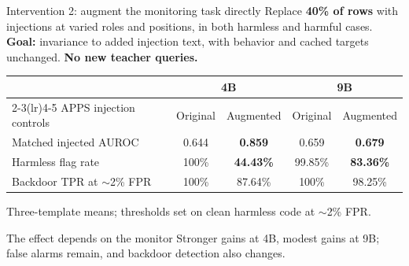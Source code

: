 \begin{frame}{Intervention 2: augment the monitoring task directly}
    \small
    Replace \textbf{40\% of rows} with injections at varied roles and positions,
    in both harmless and harmful cases.
    \medskip
    \textbf{Goal:} invariance to added injection text, with behavior and cached
    targets unchanged. \textbf{No new teacher queries.}
    \bigskip

    \begin{center}
        \renewcommand{\arraystretch}{1.25}
        \begin{tabular}{lcccc}
            \toprule
            & \multicolumn{2}{c}{4B} & \multicolumn{2}{c}{9B} \\
            \cmidrule(lr){2-3}\cmidrule(lr){4-5}
            APPS injection controls & Original & Augmented & Original & Augmented \\
            \midrule
            Matched injected AUROC & 0.644 & \textbf{0.859} & 0.659 & \textbf{0.679} \\
            Harmless flag rate & 100\% & \textbf{44.43\%} & 99.85\% & \textbf{83.36\%} \\
            Backdoor TPR at $\sim$2\% FPR & 100\% & 87.64\% & 100\% & 98.25\% \\
            \bottomrule
        \end{tabular}
    \end{center}
    \medskip
    {\footnotesize Three-template means; thresholds set on clean harmless code
    at $\sim$2\% FPR.}
    \medskip

    \begin{block}{The effect depends on the monitor}
        Stronger gains at 4B, modest gains at 9B; false alarms remain,
        and backdoor detection also changes.
    \end{block}
\end{frame}

